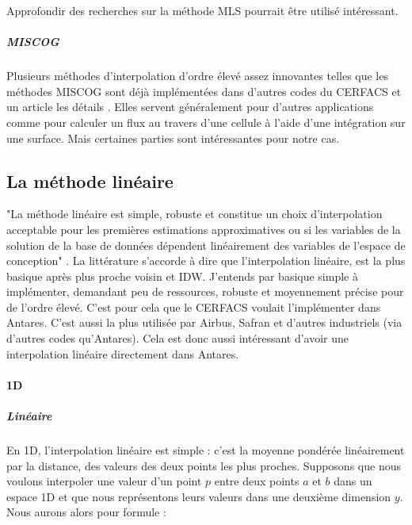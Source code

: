 
Approfondir des recherches sur la méthode \ac{MLS} \cite{MLS} \cite{levin}  pourrait être utilisé intéressant.

\subparagraph{MISCOG}

Plusieurs méthodes d'interpolation d'ordre élevé assez innovantes telles que les méthodes \ac{MISCOG} sont déjà implémentées dans d'autres codes du CERFACS et un article les détails \cite{laborderie2018}. Elles servent généralement pour d'autres applications comme pour calculer un flux au travers d'une cellule à l'aide d'une intégration sur une surface. Mais certaines parties sont intéressantes pour notre cas.













\subsection{La méthode linéaire}
"La méthode linéaire est simple, robuste et constitue un choix d'interpolation acceptable pour les premières estimations approximatives ou si les variables de la solution de la base de données dépendent linéairement des variables de l'espace de conception" \cite{palmer2009}.
La littérature \cite{fluidssengineer} s'accorde à dire que l'interpolation linéaire, est la plus basique après plus proche voisin et IDW. J'entends par basique simple à implémenter, demandant peu de ressources, robuste et moyennement précise pour de l'ordre élevé. C'est pour cela que le CERFACS voulait l'implémenter dans Antares. C'est aussi la plus utilisée par Airbus, Safran et d'autres industriels (via d'autres codes qu'Antares). Cela est donc aussi intéressant d'avoir une interpolation linéaire directement dans Antares.


\paragraph{1D}
\subparagraph{Linéaire}

En 1D, l'interpolation linéaire est simple : c'est la moyenne pondérée linéairement par la distance, des valeurs des deux points les plus proches.
Supposons que nous voulons interpoler une valeur d'un point \( p \) entre deux points \( a \) et \( b \) dans un espace 1D
et que nous représentons leurs valeurs dans une deuxième dimension \( y \).
Nous aurons alors pour formule :

